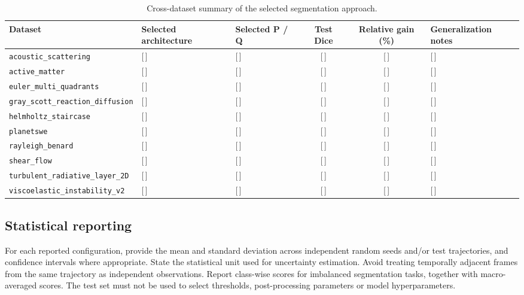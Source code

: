 \documentclass[final,5p,times,twocolumn]{elsarticle}
\begin{document}
\begin{table}[t]
    \centering
    \caption{Cross-dataset summary of the selected segmentation approach.}
    \label{tab:cross_dataset}
    \small
    \begin{tabularx}{\textwidth}{L{3.1cm} L{2.1cm} L{2.1cm} c c Y}
        \toprule
        \textbf{Dataset} & \textbf{Selected architecture} &
        \textbf{Selected P / Q} & \textbf{Test Dice} &
        \textbf{Relative gain (\%)} & \textbf{Generalization notes} \\
        \midrule
        \texttt{acoustic\_scattering} & [\,] & [\,] & [\,] & [\,] & [\,] \\
        \texttt{active\_matter} & [\,] & [\,] & [\,] & [\,] & [\,] \\
        \texttt{euler\_multi\_quadrants} & [\,] & [\,] & [\,] & [\,] & [\,] \\
        \texttt{gray\_scott\_reaction\_diffusion} & [\,] & [\,] & [\,] & [\,] & [\,] \\
        \texttt{helmholtz\_staircase} & [\,] & [\,] & [\,] & [\,] & [\,] \\
        \texttt{planetswe} & [\,] & [\,] & [\,] & [\,] & [\,] \\
        \texttt{rayleigh\_benard} & [\,] & [\,] & [\,] & [\,] & [\,] \\
        \texttt{shear\_flow} & [\,] & [\,] & [\,] & [\,] & [\,] \\
        \texttt{turbulent\_radiative\_layer\_2D} & [\,] & [\,] & [\,] & [\,] & [\,] \\
        \texttt{viscoelastic\_instability\_v2} & [\,] & [\,] & [\,] & [\,] & [\,] \\
        \bottomrule
    \end{tabularx}
\end{table}

\subsection{Statistical reporting}
\label{subsec:statistics}

For each reported configuration, provide the mean and standard deviation
across independent random seeds and/or test trajectories, and confidence
intervals where appropriate. State the statistical unit used for uncertainty
estimation. Avoid treating temporally adjacent frames from the same trajectory
as independent observations. Report class-wise scores for imbalanced
segmentation tasks, together with macro-averaged scores. The test set must not
be used to select thresholds, post-processing parameters or model
hyperparameters.
\end{document}
